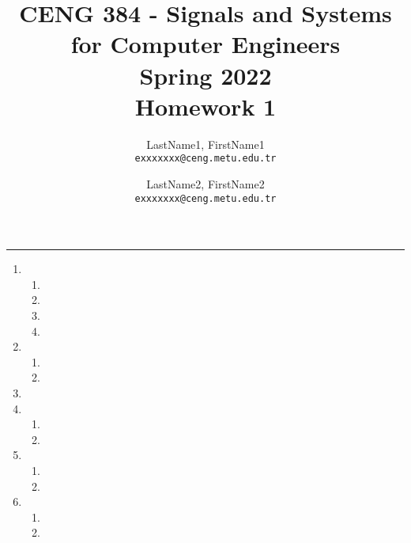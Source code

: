 \documentclass[10pt,a4paper, margin=1in]{article}
\author{
  LastName1, FirstName1\\
  \texttt{exxxxxxx@ceng.metu.edu.tr}
  \and
  LastName2, FirstName2\\
  \texttt{exxxxxxx@ceng.metu.edu.tr}
}
\title{CENG 384 - Signals and Systems for Computer Engineers \\
Spring 2022 \\
Homework 1}
\begin{document}
\maketitle



\noindent\rule{19cm}{1.2pt}

\begin{enumerate}

\item %
    \begin{enumerate}
    \item %
    \item %
    \item %
    \item %
    \end{enumerate}

\item %
    \begin{enumerate}
    \item %
    \item %
    \end{enumerate}

\item %

\item %
    \begin{enumerate}
    \item %
    \item %
    \end{enumerate}

\item %
    \begin{enumerate}   
    \item %
    \item %
    \end{enumerate}

\item %
    \begin{enumerate}
    \item %
    \item %
    \end{enumerate}    
    

\end{enumerate}
\end{document}
